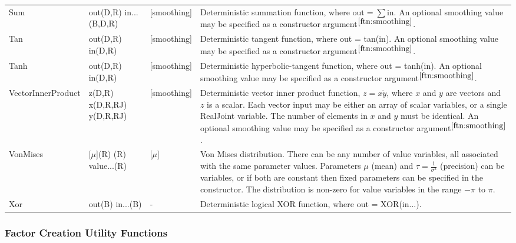 \begin{longtable} {p{3.5cm} p{2.2cm} p{2cm} p{7cm}}
%
Sum & out(D,R) \newline in...(B,D,R) & [smoothing] & Deterministic summation function, where $\mathrm{out} = \sum \mathrm{in}$. An optional smoothing value may be specified as a constructor argument$^{\ref{ftn:smoothing}}$. \\
%
Tan & out(D,R) \newline in(D,R) & [smoothing] & Deterministic tangent function, where out = tan(in). An optional smoothing value may be specified as a constructor argument$^{\ref{ftn:smoothing}}$. \\
%
Tanh & out(D,R) \newline in(D,R) & [smoothing] & Deterministic hyperbolic-tangent function, where out = tanh(in). An optional smoothing value may be specified as a constructor argument$^{\ref{ftn:smoothing}}$. \\
%
VectorInnerProduct & z(D,R) \newline x(D,R,RJ) \newline y(D,R,RJ) & [smoothing] & Deterministic vector inner product function, $z = x \dot y$, where $x$ and $y$ are vectors and $z$ is a scalar. Each vector input may be either an array of scalar variables, or a single RealJoint variable. The number of elements in $x$ and $y$ must be identical. An optional smoothing value may be specified as a constructor argument$^{\ref{ftn:smoothing}}$. \\
%
VonMises & [$\mu$](R) \newline [$\tau$](R) \newline value...(R) & [$\mu$] \newline [$\tau$] & Von Mises distribution. There can be any number of value variables, all associated with the same parameter values.  Parameters $\mu$ (mean) and $\tau = \frac{1}{\sigma^{2}}$ (precision) can be variables, or if both are constant then fixed parameters can be specified in the constructor.  The distribution is non-zero for value variables in the range $-\pi$ to $\pi$. \\
%
Xor & out(B) \newline in...(B) & - & Deterministic logical XOR function, where out = XOR(in...). \\
%
\end{longtable}



\ifmatlab
\subsubsection{Factor Creation Utility Functions}


